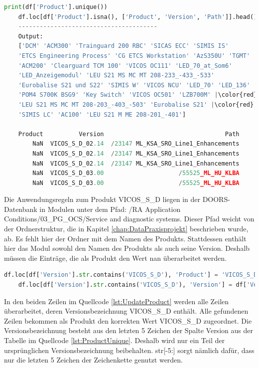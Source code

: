 \begin{lstlisting}[language = python, caption={Ausprägungen des Attributs Product},captionpos=b, label = lst:ProductUnique, floatplacement=H, escapechar={|}]
    print(df['Product'].unique())
    df.loc[df['Product'].isna(), ['Product', 'Version', 'Path']].head()
    ---------------------------------------
    Output:
    ['DCM' 'ACM300' 'Trainguard 200 RBC' 'SICAS ECC' 'SIMIS IS'
    'ETCS Engineering Process' 'CG ETCS Workstation' 'AzS350U' 'TGMT'
    'ACM200' 'Clearguard TCM 100' 'VICOS OC111' 'LED_70_at_Som6'
    'LED_Anzeigemodul' 'LEU S21 MS MC MT 208-233_-433_-533'
    'Eurobalise S21 und S22' 'SIMIS W' 'VICOS NCU' 'LED_70' 'LED_136'
    'POM4 S700K BSG9' 'Key Switch' 'VICOS OC501' 'LZB700M' |\color{red}nan|
    'LEU S21 MS MC MT 208-203_-403_-503' 'Eurobalise S21' |\color{red}'/'| 'DTS'
    'SIMIS LC' 'AC100' 'LEU S21 M ME 208-201_-401']

    Product          Version                                  Path
        NaN  VICOS_S_D_02.14  /23147 ML_KSA_SRO_Line1_Enhancements
        NaN  VICOS_S_D_02.14  /23147 ML_KSA_SRO_Line1_Enhancements
        NaN  VICOS_S_D_02.14  /23147 ML_KSA_SRO_Line1_Enhancements
        NaN  VICOS_S_D_03.00                     /55525_ML_HU_KLBA
        NaN  VICOS_S_D_03.00                     /55525_ML_HU_KLBA
\end{lstlisting}

Die Anwendungsregeln zum Produkt \glqq VICOS\_S\_D\grqq{} liegen in der \ac{DOORS}-Datenbank in Modulen unter dem Pfad: /RA Application Conditions/03\_PG\_OCS/Service and diagnostic systems.
Dieser Pfad weicht von der Ordnerstruktur, die in Kapitel \ref*{chap:DataPraxisprojekt} beschrieben wurde, ab. Es fehlt hier der Ordner mit dem Namen des Produkts.
Stattdessen enthält hier das Modul sowohl den Namen des Produkts als auch seine Version. Deshalb müssen die Einträge, die als Produkt den Wert \glqq nan\grqq{}
überarbeitet werden. 

\begin{lstlisting}[language = python, caption={Eintragen der korrekten Produkt- und Versionsbezeichnung},captionpos=b, label = lst:UpdateProduct, floatplacement=H]
    df.loc[df['Version'].str.contains('VICOS_S_D'), 'Product'] = 'VICOS_S_D'
    df.loc[df['Version'].str.contains('VICOS_S_D'), 'Version'] = df['Version'].str[-5:]  
\end{lstlisting}

In den beiden Zeilen im Quellcode \ref*{lst:UpdateProduct} werden alle Zeilen überarbeitet, deren Versionsbezeichnung \glqq VICOS\_S\_D\grqq{} enthält.
Alle gefundenen Zeilen bekommen als Produkt den korrekten Wert \glqq VICOS\_S\_D\grqq{} zugeordnet. Die Versionsbezeichnung besteht aus den letzten 5 Zeichen
der Spalte \glqq Version\grqq{} aus der Tabelle im Quellcode \ref*{lst:ProductUnique}. Deshalb wird nur ein Teil der ursprünglichen Versionsbezeichnung
beibehalten. str[-5:] sorgt nämlich dafür, dass nur die letzten 5 Zeichen der Zeichenkette genutzt werden.

